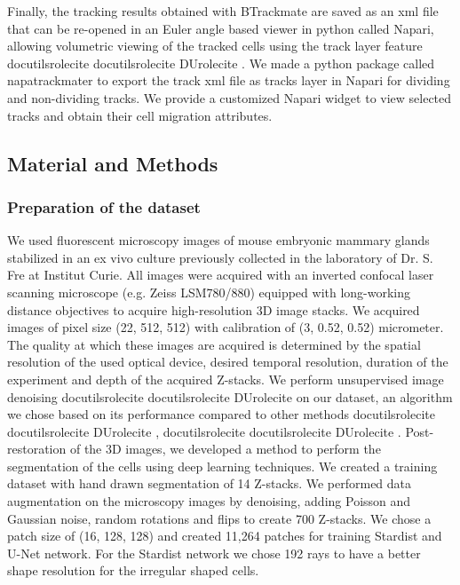 \documentclass[letterpaper,compsoc,twoside,onecolumn]{IEEEtran}
\providecommand*{\DUrole}[2]{%
  \ifcsname docutilsrole#1\endcsname%
    \csname docutilsrole#1\endcsname{#2}%
  \else
    \csname DUrole#1\endcsname{#2}%
  \fi%
}
\begin{document}
Finally, the tracking results obtained with BTrackmate are saved as an xml file that can be re-opened in an Euler angle based viewer in python called Napari, allowing volumetric viewing of the tracked cells using the track layer feature \DUrole{cite}{Ulicna2020}. We made a python package called napatrackmater to export the track xml file as tracks layer in Napari for dividing and non-dividing tracks. We provide a customized Napari widget to view selected tracks and obtain their cell migration attributes.

\subsection{Material and Methods%
  \label{material-and-methods}%
}


\subsubsection{Preparation of the dataset%
  \label{preparation-of-the-dataset}%
}


We used fluorescent microscopy images of mouse embryonic mammary glands stabilized in an ex vivo culture previously collected in the laboratory of Dr. S. Fre at Institut Curie. All images were acquired with an inverted confocal laser scanning microscope (e.g. Zeiss LSM780/880) equipped with long-working distance objectives to acquire high-resolution 3D image stacks. We acquired images of pixel size (22, 512, 512) with calibration of (3, 0.52, 0.52) micrometer.
The quality at which these images are acquired is determined by the spatial resolution of the used optical device, desired temporal resolution, duration of the experiment and depth of the acquired Z-stacks. We perform unsupervised image denoising \DUrole{cite}{krull2019} on our dataset, an algorithm we chose based on its performance compared to other methods \DUrole{cite}{Richardson72}, \DUrole{cite}{Lucy74}.
Post-restoration of the 3D images, we developed a method to perform the segmentation of the cells using deep learning techniques. We created a training dataset with hand drawn segmentation of 14 Z-stacks. We performed data augmentation on the microscopy images by denoising, adding Poisson and Gaussian noise, random rotations and flips to create 700 Z-stacks. We chose a patch size of (16, 128, 128) and created 11,264 patches for training Stardist and U-Net network. For the Stardist network we chose 192 rays to have a better shape resolution for the irregular shaped cells.
\end{document}
